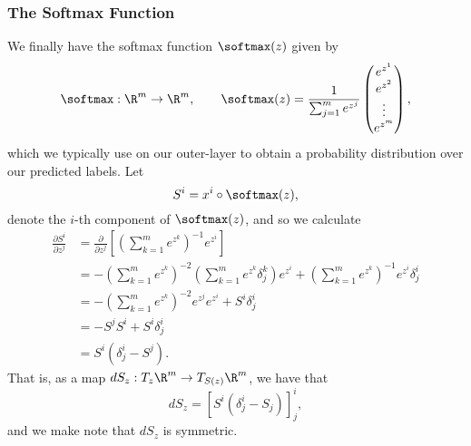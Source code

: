 \subsubsection{The Softmax Function}
We finally have the softmax function $\softmax(z)$ given by
$$\softmax:\R^m\to\R^m,\qquad \softmax(z)=\frac{1}{\sum_{j=1}^me^{z^j}}\begin{pmatrix}
	e^{z^1}\\
	e^{z^2}\\
	\vdots\\
	e^{z^m}
\end{pmatrix},$$
which we typically use on our outer-layer to obtain a probability distribution over our predicted labels.  Let
$$S^i=x^i\circ\softmax(z),$$
denote the $i$-th component of $\softmax(z)$, and so we calculate
\begin{align*}
	\frac{\partial S^i}{\partial z^j}&=\frac{\partial}{\partial z^j}\left[\left(\sum_{k=1}^me^{z^k}\right)^{-1}e^{z^i}\right]\\
	&=-\left(\sum_{k=1}^me^{z^k}\right)^{-2}\left(\sum_{k=1}^me^{z^k}\delta_j^k\right)e^{z^i}+\left(\sum_{k=1}^me^{z^k}\right)^{-1}e^{z^i}\delta^i_j\\
	&=-\left(\sum_{k=1}^me^{z^k}\right)^{-2}e^{z^j}e^{z^i}+S^i\delta^i_j\\
	&=-S^jS^i+S^i\delta^i_j\\
	&=S^i(\delta^i_j-S^j).
\end{align*}
That is, as a map $dS_z:T_z\R^m\to T_{S(z)}\R^m$, we have that
$$dS_z=[S^i(\delta^i_j-S_j)]^i_j,$$
and we make note that $dS_z$ is symmetric.





